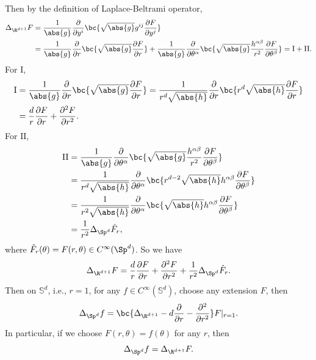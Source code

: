 \begin{enumerate}[label=\arabic{*}.]
    Then by the definition of Laplace-Beltrami operator,  
    \begin{align*}
        \Delta_{\R^{d+1}}F &= \frac{1}{\abs{g}} \frac{\partial}{\partial y^i}\bc{\sqrt{\abs{g}}g^{ij}\frac{\partial F}{\partial y^j}}\\
        &=\frac{1}{\abs{g}} \frac{\partial}{\partial r}\bc{\sqrt{\abs{g}}\frac{\partial F}{\partial r}} + \frac{1}{\abs{g}} \frac{\partial}{\partial \theta^\alpha}\bc{\sqrt{\abs{g}}\frac{h^{\alpha \beta}}{r^2}\frac{\partial F}{\partial \theta^\beta}} = \mathrm{I} + \mathrm{II}.
    \end{align*}
    For $\mathrm{I}$,
    \begin{align*}
        \mathrm{I}&=\frac{1}{\abs{g}} \frac{\partial}{\partial r}\bc{\sqrt{\abs{g}}\frac{\partial F}{\partial r}}  = \frac{1}{r^d\sqrt{\abs{h}}} \frac{\partial}{\partial r}\bc{r^d\sqrt{\abs{h}}\frac{\partial F}{\partial r}} \\
        &= \frac{d}{r} \frac{\partial F}{\partial r} + \frac{\partial^2 F}{\partial r^2}.
    \end{align*}
    For $\mathrm{II}$,
    \begin{align*}
        \mathrm{II}&= \frac{1}{\abs{g}} \frac{\partial}{\partial \theta^\alpha}\bc{\sqrt{\abs{g}}\frac{h^{\alpha \beta}}{r^2}\frac{\partial F}{\partial \theta^\beta}}  \\
        &= \frac{1}{r^d\sqrt{\abs{h}}}\frac{\partial}{\partial \theta^\alpha}\bc{r^{d-2}\sqrt{\abs{h}}h^{\alpha \beta}\frac{\partial F}{\partial \theta^\beta}} \\
        &= \frac{1}{r^2\sqrt{\abs{h}}}\frac{\partial}{\partial \theta^\alpha}\bc{\sqrt{\abs{h}}h^{\alpha \beta}\frac{\partial F}{\partial \theta^\beta}} \\
        &= \frac{1}{r^2} \Delta_{\Sp^d}\hat{F}_r,
    \end{align*}
    where $\hat{F}_r(\theta) = F(r,\theta) \in C^\infty(\Sp^d)$. So we have
    \begin{equation*}
        \Delta_{\R^{d+1}}F = \frac{d}{r} \frac{\partial F}{\partial r} + \frac{\partial^2 F}{\partial r^2} + \frac{1}{r^2} \Delta_{\Sp^d}\hat{F}_r.
    \end{equation*}
    Then on $\mathbb{S}^d$, i.e., $r = 1$, for any $f \in C^\infty(\mathbb{S}^d)$, choose any extension $F$, then
    \begin{equation*}
        \Delta_{\Sp^d} f = \bc{\Delta_{\R^{d+1}} - d\frac{\partial}{\partial r} - \frac{\partial^2}{\partial r^2}}F|_{r=1}.
    \end{equation*}
    In particular, if we choose $F(r,\theta) = f(\theta)$ for any $r$, then
    \begin{equation*}
        \Delta_{\Sp^d} f = \Delta_{\R^{d+1}}F.
    \end{equation*}


\end{enumerate}
